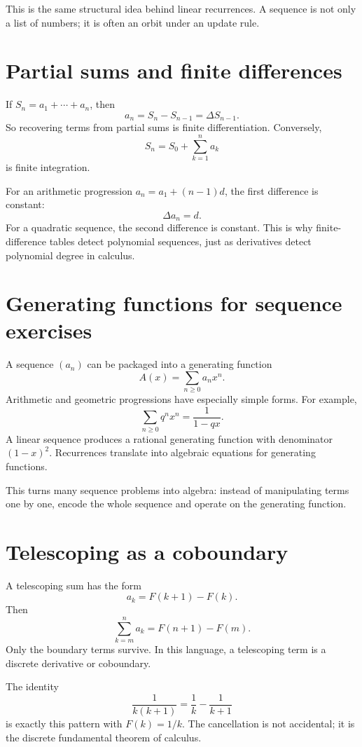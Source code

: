 This is the same structural idea behind linear recurrences.  A sequence is not only a list of numbers; it is often an orbit under an update rule.

\section{Partial sums and finite differences}

If \(S_n=a_1+\cdots+a_n\), then
\[
  a_n=S_n-S_{n-1}=\Delta S_{n-1}.
\]
So recovering terms from partial sums is finite differentiation.  Conversely,
\[
  S_n=S_0+\sum_{k=1}^{n}a_k
\]
is finite integration.

For an arithmetic progression \(a_n=a_1+(n-1)d\), the first difference is constant:
\[
  \Delta a_n=d.
\]
For a quadratic sequence, the second difference is constant.  This is why finite-difference tables detect polynomial sequences, just as derivatives detect polynomial degree in calculus.

\section{Generating functions for sequence exercises}

A sequence \((a_n)\) can be packaged into a generating function
\[
  A(x)=\sum_{n\ge0}a_nx^n.
\]
Arithmetic and geometric progressions have especially simple forms.  For example,
\[
  \sum_{n\ge0}q^nx^n=\frac{1}{1-qx}.
\]
A linear sequence produces a rational generating function with denominator \((1-x)^2\).  Recurrences translate into algebraic equations for generating functions.

This turns many sequence problems into algebra: instead of manipulating terms one by one, encode the whole sequence and operate on the generating function.

\section{Telescoping as a coboundary}

A telescoping sum has the form
\[
  a_k=F(k+1)-F(k).
\]
Then
\[
  \sum_{k=m}^{n}a_k=F(n+1)-F(m).
\]
Only the boundary terms survive.  In this language, a telescoping term is a discrete derivative or coboundary.

The identity
\[
  \frac{1}{k(k+1)}=\frac1k-\frac{1}{k+1}
\]
is exactly this pattern with \(F(k)=1/k\).  The cancellation is not accidental; it is the discrete fundamental theorem of calculus.

